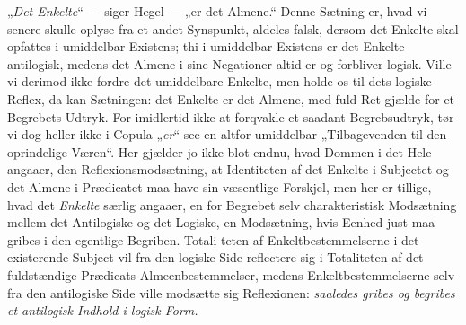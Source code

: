 \documentclass[11pt]{book}
\newcommand{\opage}[1]{\marginnote{\footnotesize\textit{[#1]}}}
\begin{document}
„\emph{Det Enkelte}“ --- siger Hegel --- „er det Almene.“ Denne
Sætning er, hvad vi senere skulle oplyse fra et andet Synspunkt,
aldeles falsk, dersom det Enkelte skal opfattes i umiddelbar Existens;
thi i umiddelbar Existens er det Enkelte antilogisk, medens det Almene
i sine Negationer altid er og forbliver logisk. Ville vi derimod ikke
fordre det umiddelbare Enkelte, men holde os til dets logiske Reflex,
da kan Sætningen: det Enkelte er det Almene, med fuld Ret gjælde for
et Begrebets Udtryk. For imidlertid ikke at forqvakle et saadant
Begrebsudtryk, tør vi dog heller ikke i Copula „\emph{er}“ see en
altfor umiddelbar „Tilbagevenden til den oprindelige Væren“. Her
gjælder jo ikke blot endnu, hvad Dommen i det Hele angaaer, den
Reflexionsmodsætning, at Identiteten af det Enkelte i Subjectet og det
Almene i Prædicatet maa have sin væsentlige Forskjel, men her er
tillige, hvad det \emph{Enkelte} særlig angaaer, en for Begrebet selv
charakteristisk Modsætning mellem det Antilogiske og det Logiske, en
Modsætning, hvis Eenhed just maa gribes i den egentlige Begriben.
Totali\-%
\opage{154} \setcounter{footnote}{0}%
teten af Enkeltbestemmelserne i det existerende Subject vil fra den
logiske Side reflectere sig i Totaliteten af det fuldstændige
Prædicats Almeenbestemmelser, medens Enkeltbestemmelserne selv fra den
antilogiske Side ville modsætte sig Reflexionen: \emph{saaledes gribes
og begribes et antilogisk Indhold i logisk Form.}
\end{document}
